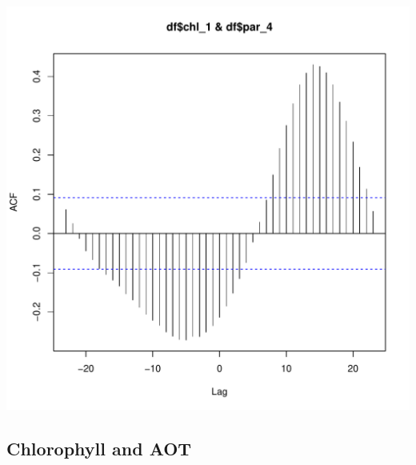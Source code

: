 \documentclass{article}\usepackage[]{graphicx}\usepackage[]{color}
\makeatletter
\def\maxwidth{ %
  \ifdim\Gin@nat@width>\linewidth
    \linewidth
  \else
    \Gin@nat@width
  \fi
}
\newenvironment{knitrout}{}{} %
\makeatother
\begin{document}
\begin{knitrout}
\includegraphics[width=\maxwidth]{figure/unnamed-chunk-18-2} 

\end{knitrout}

\subsection{Chlorophyll and AOT}
\end{document}
